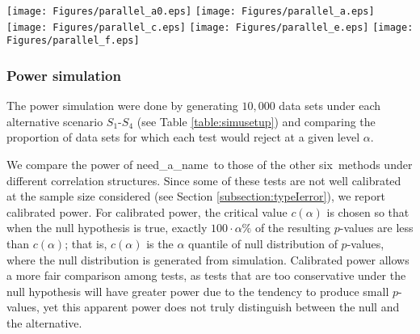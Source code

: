 \documentclass[useAMS,usenatbib, galley]{biom}
\newcommand{\OurMethod}{need\_a\_name}
\newcommand{\HowmanyTest}{six}
\newcommand{\aaCase}{a}
\newcommand{\fCase}{e}
\begin{document}
	
	\begin{figure*}[!th]
		\begin{center}
			\texttt{[image: Figures/parallel\_a0.eps]}
			\texttt{[image: Figures/parallel\_a.eps]}
			\texttt{[image: Figures/parallel\_c.eps]}
			\texttt{[image: Figures/parallel\_e.eps]}
			\texttt{[image: Figures/parallel\_f.eps]}
		\end{center} 
	\caption{Uniform quantile-quantile plots for $p$-values by different methods. Each plot from top to bottom corresponds to correlation structures (\aaCase)-(\fCase), respectively. The left column is for group $A_1$ simulation, and the right column for group $A_2$ simulation (see Table \ref{table:simusetup} for detail). Results are based on 10,000 simulations.}\label{fig:typeIerror}
	\end{figure*} 

	
	\subsubsection{Power simulation}\label{subsection:power}		 

	The power simulation were done by generating $10,000$ data sets under each alternative scenario $S_1$-$S_4$ (see Table \ref{table:simusetup}) and comparing the proportion of data sets for which each test would reject at a given level $\alpha$. 
	
	We compare the power of \OurMethod~to those of the other \HowmanyTest~methods under different correlation structures. Since some of these tests are not well calibrated at the sample size considered (see Section \ref{subsection:typeIerror}), we report calibrated power. For calibrated power, the critical value $c(\alpha)$ is chosen so that when the null hypothesis is true, exactly $100\cdot\alpha\%$ of the resulting $p$-values are less than $c(\alpha)$; that is, $c(\alpha)$ is  the $\alpha$ quantile of null distribution of $p$-values, where the null distribution is generated from simulation. Calibrated power allows a more fair comparison among tests, as tests that are too conservative under the null hypothesis will have greater power due to the tendency to produce small $p$-values, yet this apparent power does not truly distinguish between the null and the alternative.  
	
\end{document}
